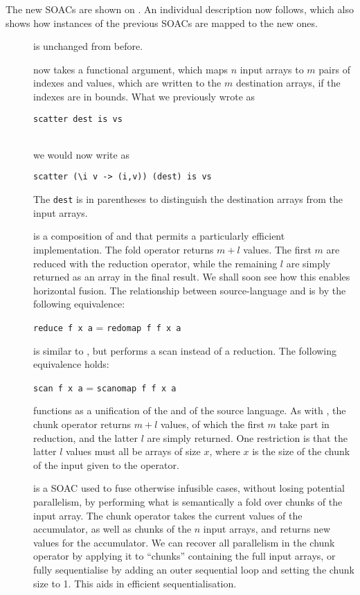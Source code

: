The new SOACs are shown on .  An individual
description now follows, which also shows how instances of the
previous SOACs are mapped to the new ones.

\begin{description}
\item[{}] is unchanged from before.
\item[{}] now takes a functional argument, which maps $n$
  input arrays to $m$ pairs of indexes and values, which are written
  to the $m$ destination arrays, if the indexes are in bounds.
  What we previously wrote as\\
  \centerline{\lstinline{scatter dest is vs}}\\
  we would now write as\\
  \centerline{\lstinline{scatter (\i v -> (i,v)) (dest) is vs}} The
  \lstinline{dest} is in parentheses to distinguish the destination
  arrays from the input arrays.
\item[] is a composition of  and  that
  permits a particularly efficient implementation.    The  fold operator returns $m+l$ values.
  The first $m$ are reduced with the reduction operator, while the
  remaining $l$ are simply returned as an array in the final result.
  We shall soon see how this enables horizontal fusion.  The
  relationship between source-language  and  is
  by the
  following equivalence:\\
  \centerline{\lstinline{reduce f x a} = \lstinline{redomap f f x a}}
\item[] is similar to , but performs a scan
  instead of a reduction.  The following equivalence holds:\\
  \centerline{\lstinline{scan f x a} = \lstinline{scanomap f f x a}}
\item[] functions as a unification of the
   and  of the source language.  As
  with , the chunk operator returns $m+l$ values, of which
  the first $m$ take part in reduction, and the latter $l$ are simply
  returned.  One restriction is that the latter $l$ values must all be
  arrays of size $x$, where $x$ is the size of the chunk of the input
  given to the operator.
\item[] is a SOAC used to fuse otherwise infusible
  cases, without losing potential parallelism, by performing what is
  semantically a fold over chunks of the input array.  The chunk
  operator takes the current values of the accumulator, as well as
  chunks of the $n$ input arrays, and returns new values for the
  accumulator.  We can recover all parallelism in the chunk operator
  by applying it to ``chunks'' containing the full input arrays, or
  fully sequentialise by adding an outer sequential loop and setting
  the chunk size to 1.  This aids in efficient sequentialisation.
\end{description}

